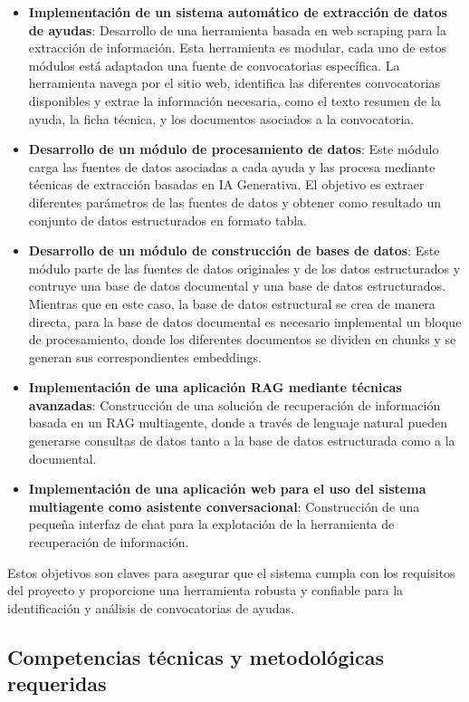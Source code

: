 \begin{itemize}
    \item \textbf{Implementación de un sistema automático de extracción de datos de ayudas}: 
    Desarrollo de una herramienta basada en web scraping para la extracción de información.
    Esta herramienta es modular, cada uno de estos módulos está adaptadoa una fuente de convocatorias específica.
    La herramienta navega por el sitio web, identifica las diferentes convocatorias disponibles y extrae la información necesaria, como el texto resumen de la ayuda, la ficha técnica, y los documentos asociados a la convocatoria.
    \item \textbf{Desarrollo de un módulo de procesamiento de datos}: 
    Este módulo carga las fuentes de datos asociadas a cada ayuda y las procesa mediante técnicas de extracción basadas en IA Generativa.
    El objetivo es extraer diferentes parámetros de las fuentes de datos y obtener como resultado un conjunto de datos estructurados en formato tabla.
    \item \textbf{Desarrollo de un módulo de construcción de bases de datos}:
    Este módulo parte de las fuentes de datos originales y de los datos estructurados y contruye una base de datos documental y una base de datos estructurados.
    Mientras que en este caso, la base de datos estructural se crea de manera directa, para la base de datos documental es necesario implemental un bloque de procesamiento, donde los diferentes documentos se dividen en chunks y se generan sus correspondientes embeddings.
    \item \textbf{Implementación de una aplicación RAG mediante técnicas avanzadas}:
    Construcción de una solución de recuperación de información basada en un RAG multiagente, donde a través de lenguaje natural pueden generarse consultas de datos tanto a la base de datos estructurada como a la documental.
    \item \textbf{Implementación de una aplicación web para el uso del sistema multiagente como asistente conversacional}:
    Construcción de una pequeña interfaz de chat para la explotación de la herramienta de recuperación de información.
\end{itemize}

Estos objetivos son claves para asegurar que el sistema cumpla con los requisitos del proyecto y
proporcione una herramienta robusta y confiable para la identificación y análisis de convocatorias de
ayudas.



\subsection{Competencias técnicas y metodológicas requeridas}


